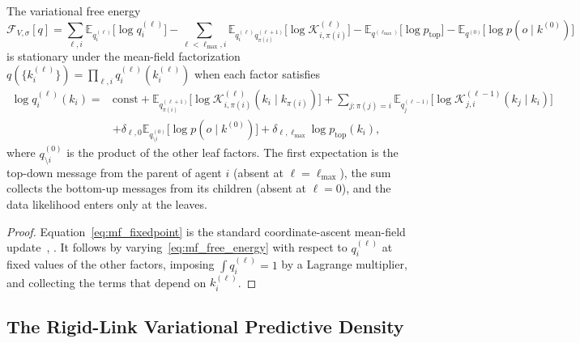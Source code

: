 \begin{lemma}
\label{lem:mf_fixedpoint}
The variational free energy
\begin{equation}
\mathcal F_{V,\sigma}[q]
=
\sum_{\ell, i} \mathbb{E}_{q_i^{(\ell)}}\big[\log q_i^{(\ell)}\big]
- \sum_{\ell < \ell_{\max}, i} \mathbb{E}_{q_i^{(\ell)} q_{\pi(i)}^{(\ell+1)}}\big[\log \mathcal{K}_{i,\pi(i)}^{(\ell)}\big]
- \mathbb{E}_{q^{(\ell_{\max})}}\big[\log p_{\mathrm{top}}\big]
- \mathbb{E}_{q^{(0)}}\big[\log p(o \mid k^{(0)})\big]
\label{eq:mf_free_energy}
\end{equation}
is stationary under the mean-field factorization $q(\{k_i^{(\ell)}\}) = \prod_{\ell, i} q_i^{(\ell)}(k_i^{(\ell)})$ when each factor satisfies
\begin{equation}
\begin{aligned}
\log q_i^{(\ell)}(k_i)
={}&
\text{const}
+ \mathbb{E}_{q_{\pi(i)}^{(\ell+1)}}\big[\log \mathcal{K}_{i,\pi(i)}^{(\ell)}(k_i \mid k_{\pi(i)})\big]
+ \sum_{j : \pi(j) = i} \mathbb{E}_{q_j^{(\ell-1)}}\big[\log \mathcal{K}_{j,i}^{(\ell-1)}(k_j \mid k_i)\big]\\
&+ \delta_{\ell,0} \mathbb{E}_{q^{(0)}_{\setminus i}}\big[\log p(o \mid k^{(0)})\big]
+ \delta_{\ell,\ell_{\max}} \log p_{\mathrm{top}}(k_i),
\end{aligned}
\label{eq:mf_fixedpoint}
\end{equation}
where $q^{(0)}_{\setminus i}$ is the product of the other leaf factors. The first expectation is the top-down message from the parent of agent $i$ (absent at $\ell = \ell_{\max}$), the sum collects the bottom-up messages from its children (absent at $\ell = 0$), and the data likelihood enters only at the leaves.
\end{lemma}

\begin{proof}
Equation~\eqref{eq:mf_fixedpoint} is the standard coordinate-ascent mean-field update~\cite[\S5.3]{Wainwright2008}, \cite[\S10.1]{Bishop2006}. It follows by varying~\eqref{eq:mf_free_energy} with respect to $q_i^{(\ell)}$ at fixed values of the other factors, imposing $\int q_i^{(\ell)} = 1$ by a Lagrange multiplier, and collecting the terms that depend on $k_i^{(\ell)}$.
\end{proof}

\subsection{The Rigid-Link Variational Predictive Density}

